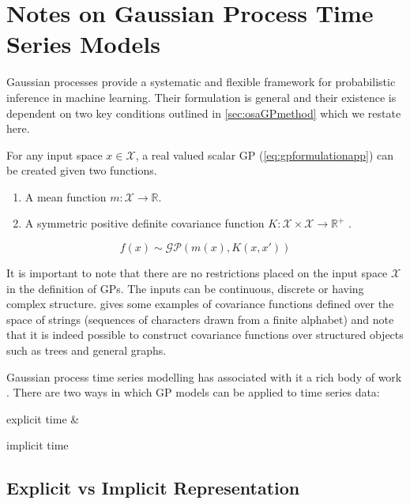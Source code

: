 \chapter{Notes on Gaussian Process Time Series Models}\label{app:gpNARX}

Gaussian processes provide a systematic and flexible framework for probabilistic inference in machine learning. 
Their formulation is general and their existence is dependent on two key conditions outlined in \cref{sec:osaGPmethod} 
which we restate here.

For any input space $x \in \mathcal{X}$, a real valued scalar GP (\cref{eq:gpformulationapp}) can be created given two functions.

\begin{enumerate}
    \item A mean function $m: \mathcal{X} \longrightarrow \mathbb{R}$.
    \item A symmetric positive definite covariance function $K: \mathcal{X} \times \mathcal{X} \longrightarrow \mathbb{R}^{+}$ \citep[ch.~1\&2]{Berlinet2004}.
\end{enumerate}    

\begin{equation}\label{eq:gpformulationapp}
    f(x) \sim \mathcal{GP}(m(x), K(x, x'))
\end{equation}

It is important to note that there are no restrictions placed on the input space $\mathcal{X}$ in the definition of GPs. The inputs 
can be continuous, discrete or having complex structure. \citet[ch.~4, sec.~4.4]{Rasmussen:2005:GPM:1162254} gives some examples of 
covariance functions defined over the space of strings (sequences of characters drawn from a finite alphabet) and note that it is indeed 
possible to construct covariance functions over structured objects such as trees and general graphs. 

Gaussian process time series modelling has associated with it a rich body of work \citep{turner2012gaussian,frigola2016bayesian}. There 
are two ways in which GP models can be applied to time series data: \begin{enumerate*} \item explicit time \& \item implicit time \end{enumerate*}

\section*{Explicit vs Implicit Representation}

